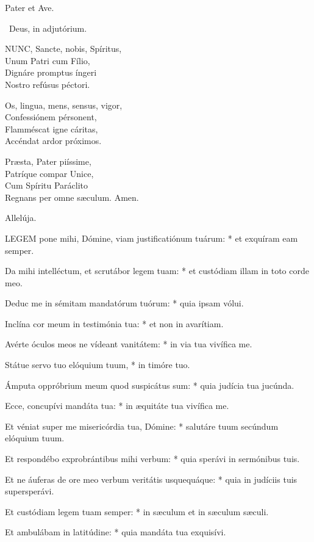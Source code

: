 
Pater et Ave.

\V\ Deus, in adjutórium.


\lettrine[lines=2]{N}{UNC}, Sancte, nobis, Spíritus,\\
Unum Patri cum Fílio,\\
Dignáre promptus íngeri\\
Nostro refúsus péctori.

Os, lingua, mens, sensus, vigor,\\
Confessiónem pérsonent,\\
Flamméscat igne cáritas,\\
Accéndat ardor próximos.

Præsta, Pater piíssime,\\
Patríque compar Unice,\\
Cum Spíritu Paráclito\\
Regnans per omne sæculum. Amen.

 Allelúja.


\lettrine[lines=2]{L}{EGEM} pone mihi, Dómine, viam justificatiónum tuárum: * et exquíram eam semper.

Da mihi intelléctum, et scrutábor legem tuam: * et custódiam illam in toto corde meo.

Deduc me in sémitam mandatórum tuórum: * quia ipsam vólui.

Inclína cor meum in testimónia tua: * et non in avarítiam.

Avérte óculos meos ne vídeant vanitátem: * in via tua vivífica me.

Státue servo tuo elóquium tuum, * in timóre tuo.

Ámputa oppróbrium meum quod suspicátus sum: * quia judícia tua jucúnda.

Ecce, concupívi mandáta tua: * in æquitáte tua vivífica me.

Et véniat super me misericórdia tua, Dómine: * salutáre tuum secúndum elóquium tuum.

Et respondébo exprobrántibus mihi verbum: * quia sperávi in sermónibus tuis.

Et ne áuferas de ore meo verbum veritátis usquequáque: * quia in judíciis tuis supersperávi.

Et custódiam legem tuam semper: * in sæculum et in sæculum sæculi.

Et ambulábam in latitúdine: * quia mandáta tua exquisívi.

